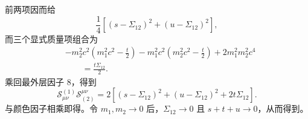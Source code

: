 \begin{derivation}[不同味夸克散射的自旋与颜色平均]
前两项因而给
\begin{equation*}
\frac14\left[(s-\Sigma_{12})^2+(u-\Sigma_{12})^2\right],
\end{equation*}
而三个显式质量项组合为
\begin{align*}
&-m_2^2c^2\left(m_1^2c^2-\frac t2\right)
-m_1^2c^2\left(m_2^2c^2-\frac t2\right)
+2m_1^2m_2^2c^4\\
&\qquad=\frac{t\Sigma_{12}}2.
\end{align*}
乘回最外层因子 $8$，得到
\begin{equation*}
 \mathcal S_{\mu\nu}^{(1)}\mathcal S_{(2)}^{\mu\nu}
 =2\left[(s-\Sigma_{12})^2+(u-\Sigma_{12})^2+2t\Sigma_{12}\right].
\end{equation*}
与颜色因子相乘即得。令 $m_1,m_2\to0$ 后，$\Sigma_{12}\to0$ 且 $s+t+u\to0$，从而得到。
\end{derivation}

